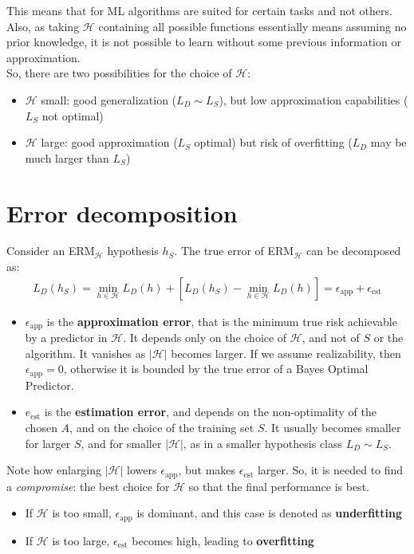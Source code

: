 \documentclass[../template.tex]{subfiles}
\begin{document}
This means that for ML algorithms are suited for certain tasks and not others. Also, as taking $\mathcal{H}$ containing all possible functions essentially means assuming no prior knowledge, it is not possible to learn without some previous information or approximation.\\

So, there are two possibilities for the choice of $\mathcal{H}$:
\begin{itemize}
    \item $\mathcal{H}$ small: good generalization ($L_D \sim L_S$), but low approximation capabilities ($L_S$ not optimal)
    \item $\mathcal{H}$ large: good approximation ($L_S$ optimal) but risk of overfitting ($L_D$ may be much larger than $L_S$) 
\end{itemize}

\section{Error decomposition}
Consider an ERM$_{\mathcal{H}}$ hypothesis $h_S$. The true error of ERM$_{\mathcal{H}}$ can be decomposed as:
\begin{align*}
    L_D(h_S) = \min_{h \in \mathcal{H}} L_D(h) + \left[L_D(h_S) - \min_{h \in \mathcal{H}} L_D(h)\right] =
    \epsilon_{\mathrm{app}} + \epsilon_{\mathrm{est}}
\end{align*} 

\begin{itemize}
    \item $\epsilon_{\mathrm{app} }$ is the \textbf{approximation error}, that is the minimum true risk achievable by a predictor in $\mathcal{H}$. It depends only on the choice of $\mathcal{H}$, and not of $S$ or the algorithm. It vanishes as $|\mathcal{H}|$ becomes larger. If we assume realizability, then $\epsilon_{\mathrm{app}} = 0$, otherwise it is bounded by the true error of a Bayes Optimal Predictor.
    \item $e_{\mathrm{est}}$ is the \textbf{estimation error}, and depends on the non-optimality of the chosen $A$, and on the choice of the training set $S$. It usually becomes smaller for larger $S$, and for smaller $|\mathcal{H}|$, as in a smaller hypothesis class $L_D \sim L_S$.
\end{itemize}
Note how enlarging $|\mathcal{H}|$ lowers $\epsilon_{\mathrm{app}}$, but makes $\epsilon_{\mathrm{est}}$ larger. So, it is needed to find a \textit{compromise}: the best choice for $\mathcal{H}$ so that the final performance is best.
\begin{itemize}
    \item If $\mathcal{H}$ is too small, $\epsilon_{\mathrm{app}}$ is dominant, and this case is denoted as \textbf{underfitting}
    \item If $\mathcal{H}$ is too large, $\epsilon_{\mathrm{est}}$ becomes high, leading to \textbf{overfitting}      
\end{itemize}
 
\end{document}
